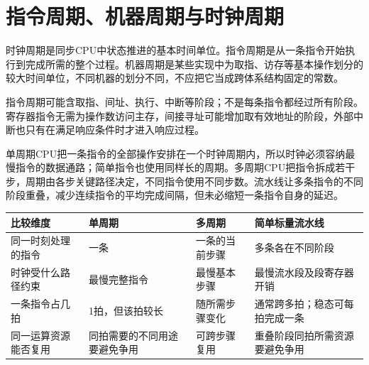 \section{指令周期、机器周期与时钟周期}\label{CO05-cycle}

时钟周期是同步CPU中状态推进的基本时间单位。指令周期是从一条指令开始执行到完成所需的整个过程。机器周期是某些实现中为取指、访存等基本操作划分的较大时间单位，不同机器的划分不同，不应把它当成跨体系结构固定的常数。

指令周期可能含取指、间址、执行、中断等阶段；不是每条指令都经过所有阶段。寄存器指令无需为操作数访问主存，间接寻址可能增加取有效地址的阶段，外部中断也只有在满足响应条件时才进入响应过程。

单周期CPU把一条指令的全部操作安排在一个时钟周期内，所以时钟必须容纳最慢指令的数据通路；简单指令也使用同样长的周期。多周期CPU把指令拆成若干步，周期由各步关键路径决定，不同指令使用不同步数。流水线让多条指令的不同阶段重叠，减少连续指令的平均完成间隔，但未必缩短一条指令自身的延迟。

\begin{wideblock}

\par\medskip\noindent\begin{minipage}{\linewidth}\fontsize{9.3}{12}\selectfont\begin{tabularx}{\linewidth}{@{}YYYY@{}}
\toprule\noalign{}
\begin{minipage}[b]{\linewidth}\raggedright
比较维度
\end{minipage} & \begin{minipage}[b]{\linewidth}\raggedright
单周期
\end{minipage} & \begin{minipage}[b]{\linewidth}\raggedright
多周期
\end{minipage} & \begin{minipage}[b]{\linewidth}\raggedright
简单标量流水线
\end{minipage} \\
\midrule\noalign{}


同一时刻处理的指令 & 一条 & 一条的当前步骤 & 多条各在不同阶段 \\
时钟受什么路径约束 & 最慢完整指令 & 最慢基本步骤 & 最慢流水段及段寄存器开销 \\
一条指令占几拍 & 1拍，但该拍较长 & 随所需步骤变化 & 通常跨多拍；稳态可每拍完成一条 \\
同一运算资源能否复用 & 同拍需要的不同用途要避免争用 & 可跨步骤复用 & 重叠阶段同拍所需资源要避免争用 \\
\bottomrule\end{tabularx}
\end{minipage}\par\medskip

\end{wideblock}

